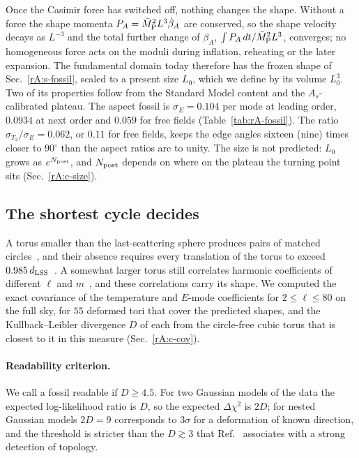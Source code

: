 Once the Casimir force has switched off, nothing changes the shape.
Without a force the shape momenta $P_A=\bar M_{\mathrm{P}}^2L^3\dot\beta_A$ are conserved, so the shape velocity decays as $L^{-3}$ and the total further change of $\beta_A$, $\int P_A\,dt/\bar M_{\mathrm{P}}^2L^3$, converges; no homogeneous force acts on the moduli during inflation, reheating or the later expansion.
The fundamental domain today therefore has the frozen shape of Sec.~\ref{rA:s-fossil}, scaled to a present size $L_0$, which we define by its volume $L_0^3$.
Two of its properties follow from the Standard Model content and the $A_s$-calibrated plateau.
The aspect fossil is $\sigma_E=0.104$ per mode at leading order, $0.0934$ at next order and $0.059$ for free fields (Table~\ref{tab:rA-fossil}). %
The ratio $\sigma_{T_2}/\sigma_E=0.062$, or $0.11$ for free fields, keeps the edge angles sixteen (nine) times closer to $90^\circ$ than the aspect ratios are to unity. %
The size is not predicted: $L_0$ grows as $e^{N_{\rm post}}$, and $N_{\rm post}$ depends on where on the plateau the turning point sits (Sec.~\ref{rA:c-size}).

\subsection{The shortest cycle decides}
\label{rA:c-shortest}

A torus smaller than the last-scattering sphere produces pairs of matched circles~\cite{Cornish:1997ab}, and their absence requires every translation of the torus to exceed $0.985\,d_{\mathrm{LSS}}$~\cite{Vaudrevange:2012da,COMPACT:2022nsu}. %
A somewhat larger torus still correlates harmonic coefficients of different $\ell$ and $m$~\cite{COMPACT:2023rkp,Himeno:2026lgh}, and these correlations carry its shape.
We computed the exact covariance of the temperature and $E$-mode coefficients for $2\leq\ell\leq80$ on the full sky, for $55$ deformed tori that cover the predicted shapes, and the Kullback--Leibler divergence $D$ of each from the circle-free cubic torus that is closest to it in this measure (Sec.~\ref{rA:c-cov}). %

\paragraph{Readability criterion.}
We call a fossil readable if $D\geq4.5$. %
For two Gaussian models of the data the expected log-likelihood ratio is $D$, so the expected $\Delta\chi^2$ is $2D$; for nested Gaussian models $2D=9$ corresponds to $3\sigma$ for a deformation of known direction, and the threshold is stricter than the $D\gtrsim3$ that Ref.~\cite{COMPACT:2022gbl} associates with a strong detection of topology. %

